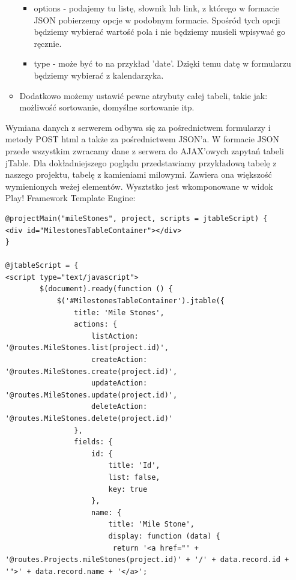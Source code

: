 \documentclass[a4paper,12pt,notitlepage]{mwrep}
\begin{document}
\begin{itemize}
\begin{itemize}
\begin{itemize}
					\item	options - podajemy tu listę, słownik lub link, z którego w formacie JSON pobierzemy opcje w podobnym 
						formacie. Spośród tych opcji będziemy wybierać wartość pola i nie będziemy musieli wpisywać go ręcznie.
					\item	type - może być to na przykład 'date'. Dzięki temu datę w formularzu będziemy wybierać z kalendarzyka.
				\end{itemize}
			\item	Dodatkowo możemy ustawić pewne atrybuty całej tabeli, takie jak: możliwość sortowanie, domyślne sortowanie itp.
		\end{itemize}
		Wymiana danych z serwerem odbywa się za pośrednictwem formularzy i metody POST html a także za pośrednictwem JSON'a. W formacie JSON 
		przede wszystkim zwracamy dane z serwera do AJAX'owych zapytań tabeli jTable. Dla dokładniejszego poglądu przedstawiamy przykładową
		tabelę z naszego projektu, tabelę z kamieniami milowymi. Zawiera ona większość wymienionych weżej elementów. Wysztstko jest 
		wkomponowane w widok Play! Framework Template Engine: \\
		\begin{verbatim}
@projectMain("mileStones", project, scripts = jtableScript) {
<div id="MilestonesTableContainer"></div>
}

@jtableScript = {
<script type="text/javascript">
        $(document).ready(function () {
            $('#MilestonesTableContainer').jtable({
                title: 'Mile Stones',
                actions: {
                    listAction: '@routes.MileStones.list(project.id)',
                    createAction: '@routes.MileStones.create(project.id)',
                    updateAction: '@routes.MileStones.update(project.id)',
                    deleteAction: '@routes.MileStones.delete(project.id)'
                },
                fields: {
                    id: {
                        title: 'Id',
                        list: false,
                        key: true
                    },
                    name: {
                        title: 'Mile Stone',
                        display: function (data) {
                         return '<a href="' + '@routes.Projects.mileStones(project.id)' + '/' + data.record.id + '">' + data.record.name + '</a>';
                        

\end{verbatim}
\end{itemize}
\end{document}
